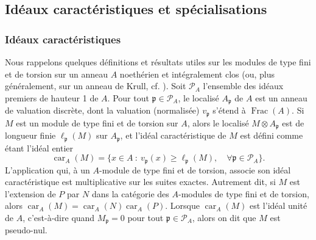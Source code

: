\documentclass[12pt]{amsart}
\newcommand\cP{\mathcal{P}}
\newcommand\gp{\mathfrak{p}}
\DeclareMathOperator{\Frac}{Frac}
\DeclareMathOperator{\car}{car}
\theoremstyle{defstyle}
\theoremstyle{thmstyle}
\newtheorem{theorem}[subsubsection]{Théorème}
\begin{document}
\subsection{Idéaux caractéristiques et spécialisations}\label{section2}
\subsubsection{Idéaux caractéristiques}
Nous rappelons quelques définitions et résultats utiles sur les modules de type fini et de torsion sur un anneau $A$ noethérien et intégralement clos (ou, plus généralement, sur un anneau de Krull, cf. \cite[Chap. VII]{bourbaki2007algebre}). Soit $\cP_A$ l'ensemble des idéaux premiers de hauteur 1 de $A$. Pour tout $\gp \in \cP_A$, le localisé $A_\gp$ de $A$ est un anneau de valuation discrète, dont la valuation (normalisée) $v_\gp$ s'étend à $\Frac(A)$. Si $M$ est un module de type fini et de torsion sur $A$, alors le localisé $M\otimes A_\gp$ est de longueur finie $\ell_\gp(M)$ sur $A_\gp$, et l'idéal caractéristique de $M$ est défini comme étant l'idéal entier 
$$\car_A(M) =  \{ x \in A \ : \ v_\gp(x) \geq \ell_\gp(M), \quad	  \forall \gp \in \cP_A\}.$$
L'application qui, à un $A$-module de type fini et de torsion, associe son idéal caractéristique est multiplicative sur les suites exactes. Autrement dit, si $M$ est l'extension de $P$ par $N$ dans la catégorie des $A$-modules de type fini et de torsion, alors  $\car_A(M)=\car_A(N)\car_A(P)$. Lorsque $\car_A (M)$ est l'idéal unité de $A$, c'est-à-dire quand $M_\gp=0$ pour tout $\gp\in \cP_A$, alors on dit que $M$ est pseudo-nul. 
%
%
\end{document}
